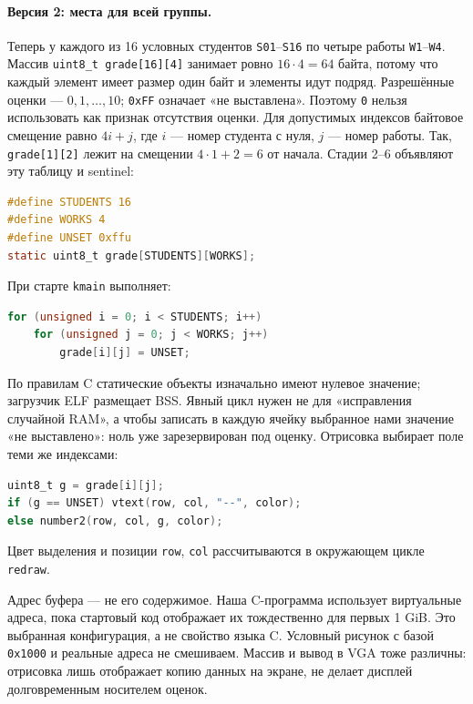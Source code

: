 \paragraph{Версия 2: места для всей группы.}
Теперь у каждого из 16 условных студентов \texttt{S01}--\texttt{S16}
по четыре работы \texttt{W1}--\texttt{W4}. Массив
\texttt{uint8\_t grade[16][4]} занимает ровно $16\cdot4=64$ байта,
потому что каждый элемент имеет размер один байт и элементы идут подряд.
Разрешённые оценки --- $0,1,\ldots,10$; \texttt{0xFF} означает
«не выставлена». Поэтому \texttt{0} нельзя использовать как признак
отсутствия оценки. Для допустимых индексов байтовое смещение равно
$4i+j$, где $i$ --- номер студента с нуля, $j$ --- номер работы.
Так, \texttt{grade[1][2]} лежит на смещении $4\cdot1+2=6$ от начала.
Стадии 2--6 объявляют эту таблицу и sentinel:
\begin{lstlisting}[language=C,basicstyle=\ttfamily\small]
#define STUDENTS 16
#define WORKS 4
#define UNSET 0xffu
static uint8_t grade[STUDENTS][WORKS];
\end{lstlisting}
При старте \texttt{kmain} выполняет:
\begin{lstlisting}[language=C,basicstyle=\ttfamily\small]
for (unsigned i = 0; i < STUDENTS; i++)
    for (unsigned j = 0; j < WORKS; j++)
        grade[i][j] = UNSET;
\end{lstlisting}
По правилам C статические объекты изначально имеют нулевое значение;
загрузчик ELF размещает BSS. Явный цикл нужен не для «исправления случайной
RAM», а чтобы записать в каждую ячейку выбранное нами значение «не выставлено»:
ноль уже зарезервирован под оценку.
Отрисовка выбирает поле теми же индексами:
\begin{lstlisting}[language=C,basicstyle=\ttfamily\small]
uint8_t g = grade[i][j];
if (g == UNSET) vtext(row, col, "--", color);
else number2(row, col, g, color);
\end{lstlisting}
Цвет выделения и позиции \texttt{row}, \texttt{col} рассчитываются
в окружающем цикле \texttt{redraw}.

Адрес буфера --- не его содержимое. Наша C-программа использует
виртуальные адреса, пока стартовый код отображает их тождественно для
первых 1 GiB. Это выбранная конфигурация, а не свойство языка C.
Условный рисунок с базой \texttt{0x1000} и реальные адреса не смешиваем.
Массив и вывод в VGA тоже различны: отрисовка лишь отображает копию
данных на экране, не делает дисплей долговременным носителем оценок.


